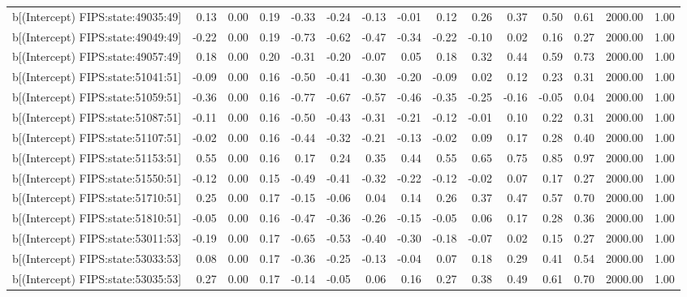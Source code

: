 \begin{table}[ht]
\begin{tabular}{rrrrrrrrrrrrrrr}
  b[(Intercept) FIPS:state:49035:49] & 0.13 & 0.00 & 0.19 & -0.33 & -0.24 & -0.13 & -0.01 & 0.12 & 0.26 & 0.37 & 0.50 & 0.61 & 2000.00 & 1.00 \\ 
  b[(Intercept) FIPS:state:49049:49] & -0.22 & 0.00 & 0.19 & -0.73 & -0.62 & -0.47 & -0.34 & -0.22 & -0.10 & 0.02 & 0.16 & 0.27 & 2000.00 & 1.00 \\ 
  b[(Intercept) FIPS:state:49057:49] & 0.18 & 0.00 & 0.20 & -0.31 & -0.20 & -0.07 & 0.05 & 0.18 & 0.32 & 0.44 & 0.59 & 0.73 & 2000.00 & 1.00 \\ 
  b[(Intercept) FIPS:state:51041:51] & -0.09 & 0.00 & 0.16 & -0.50 & -0.41 & -0.30 & -0.20 & -0.09 & 0.02 & 0.12 & 0.23 & 0.31 & 2000.00 & 1.00 \\ 
  b[(Intercept) FIPS:state:51059:51] & -0.36 & 0.00 & 0.16 & -0.77 & -0.67 & -0.57 & -0.46 & -0.35 & -0.25 & -0.16 & -0.05 & 0.04 & 2000.00 & 1.00 \\ 
  b[(Intercept) FIPS:state:51087:51] & -0.11 & 0.00 & 0.16 & -0.50 & -0.43 & -0.31 & -0.21 & -0.12 & -0.01 & 0.10 & 0.22 & 0.31 & 2000.00 & 1.00 \\ 
  b[(Intercept) FIPS:state:51107:51] & -0.02 & 0.00 & 0.16 & -0.44 & -0.32 & -0.21 & -0.13 & -0.02 & 0.09 & 0.17 & 0.28 & 0.40 & 2000.00 & 1.00 \\ 
  b[(Intercept) FIPS:state:51153:51] & 0.55 & 0.00 & 0.16 & 0.17 & 0.24 & 0.35 & 0.44 & 0.55 & 0.65 & 0.75 & 0.85 & 0.97 & 2000.00 & 1.00 \\ 
  b[(Intercept) FIPS:state:51550:51] & -0.12 & 0.00 & 0.15 & -0.49 & -0.41 & -0.32 & -0.22 & -0.12 & -0.02 & 0.07 & 0.17 & 0.27 & 2000.00 & 1.00 \\ 
  b[(Intercept) FIPS:state:51710:51] & 0.25 & 0.00 & 0.17 & -0.15 & -0.06 & 0.04 & 0.14 & 0.26 & 0.37 & 0.47 & 0.57 & 0.70 & 2000.00 & 1.00 \\ 
  b[(Intercept) FIPS:state:51810:51] & -0.05 & 0.00 & 0.16 & -0.47 & -0.36 & -0.26 & -0.15 & -0.05 & 0.06 & 0.17 & 0.28 & 0.36 & 2000.00 & 1.00 \\ 
  b[(Intercept) FIPS:state:53011:53] & -0.19 & 0.00 & 0.17 & -0.65 & -0.53 & -0.40 & -0.30 & -0.18 & -0.07 & 0.02 & 0.15 & 0.27 & 2000.00 & 1.00 \\ 
  b[(Intercept) FIPS:state:53033:53] & 0.08 & 0.00 & 0.17 & -0.36 & -0.25 & -0.13 & -0.04 & 0.07 & 0.18 & 0.29 & 0.41 & 0.54 & 2000.00 & 1.00 \\ 
  b[(Intercept) FIPS:state:53035:53] & 0.27 & 0.00 & 0.17 & -0.14 & -0.05 & 0.06 & 0.16 & 0.27 & 0.38 & 0.49 & 0.61 & 0.70 & 2000.00 & 1.00 \\ 

\end{tabular}
\end{table}
